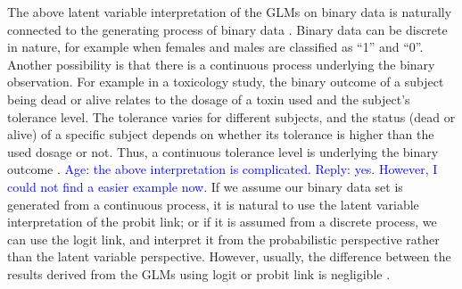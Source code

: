 The above latent variable interpretation of the GLMs on binary data is naturally connected to the generating process of binary data \cite{young1980quantifying}. Binary data can be discrete in nature, for example when females and males are classified as ``1'' and ``0''. Another possibility is that there is a continuous process underlying the binary observation. For example in a toxicology study, the binary outcome of a subject being dead or alive relates to the dosage of a toxin used and the subject's tolerance level. The tolerance varies for different subjects, and the status (dead or alive) of a specific subject depends on whether its tolerance is higher than the used dosage or not. Thus, a continuous tolerance level is underlying the binary outcome \cite{agresti2013categorical}. \textcolor{blue}{Age: the above interpretation is complicated. Reply: yes. However, I could not find a easier example now.} If we assume our binary data set is generated from a continuous process, it is natural to use the latent variable interpretation of the probit link; or if it is assumed from a discrete process, we can use the logit link, and interpret it from the probabilistic perspective rather than the latent variable perspective. However, usually, the difference between the results derived from the GLMs using logit or probit link is negligible \cite{agresti2013categorical}.

